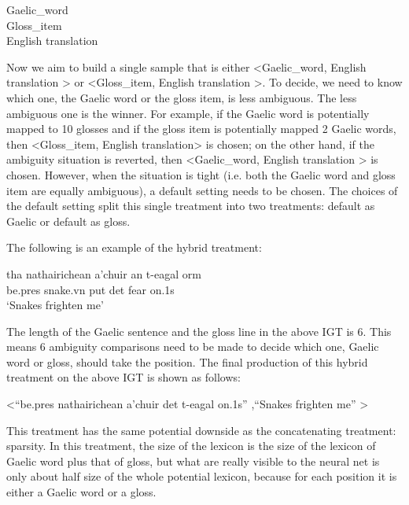 \documentclass[final]{ua-thesis}
\numberwithin{equation}{section}
\begin{document}
\begin{exe} 
\ex 
	\gll	 Gaelic\_word\\  
     		 Gloss\_item \\
    \glt    English translation  
\end{exe} 

Now we aim to build a single sample that is either <Gaelic\_word, English translation > or <Gloss\_item, English translation >. To decide, we need to know which one, the Gaelic word or the gloss item, is less ambiguous. 
The less ambiguous one is the winner. For example, if the Gaelic word is potentially mapped to 10 glosses and if the gloss item is potentially mapped 2 Gaelic words, then <Gloss\_item, English translation> is chosen; on the other hand, if the ambiguity situation is reverted, then <Gaelic\_word, English translation > is chosen. 
However, when the situation is tight (i.e. both the Gaelic word and gloss item are equally ambiguous), a default setting needs to be chosen. The choices of the default setting split this single treatment into two treatments: default as Gaelic or default as gloss.

The following is an example of the hybrid treatment:

\begin{exe}
\ex
	\gll tha nathairichean a'chuir an t-eagal orm\\
		 be.pres snake.vn put det fear on.1s\\
	\glt `Snakes frighten me' 
\end{exe} 

The length of the Gaelic sentence and the gloss line in the above IGT is 6. This means 6 ambiguity comparisons need to be made to decide which one, Gaelic word or gloss, should take the position. The final production of this hybrid treatment on the above IGT is shown as follows:

\begin{exe}
\ex <``be.pres nathairichean a'chuir det t-eagal on.1s'' ,``Snakes frighten me'' >
\end{exe} 

This treatment has the same potential downside as the concatenating treatment: sparsity. In this treatment, the size of the lexicon is the size of the lexicon of Gaelic word plus that of gloss, but what are really visible to the neural net is only about half size of the whole potential lexicon, because for each position it is either a Gaelic word or a gloss.
\end{document}
